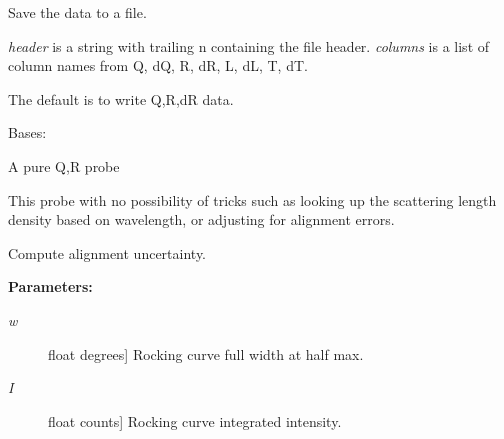 \documentclass[letterpaper,10pt,english]{sphinxmanual}
\begin{document}
\begin{fulllineitems}
\begin{fulllineitems}
\label{api/probe:refl1d.probe.ProbeSet.write_data}
Save the data to a file.

\emph{header} is a string with trailing n containing the file header.
\emph{columns} is a list of column names from Q, dQ, R, dR, L, dL, T, dT.

The default is to write Q,R,dR data.

\end{fulllineitems}


\end{fulllineitems}


\begin{fulllineitems}
\label{api/probe:refl1d.probe.QProbe}
Bases: {\hyperref[api/probe:refl1d.probe.Probe]{}}

A pure Q,R probe

This probe with no possibility of tricks such as looking up the
scattering length density based on wavelength, or adjusting for
alignment errors.

\begin{fulllineitems}
\label{api/probe:refl1d.probe.QProbe.Q}
\end{fulllineitems}


\begin{fulllineitems}
\label{api/probe:refl1d.probe.QProbe.alignment_uncertainty}
Compute alignment uncertainty.

\textbf{Parameters:}
\begin{description}
\item[{\emph{w}}] \leavevmode{[}float \textbar{} degrees{]}
Rocking curve full width at half max.

\item[{\emph{I}}] \leavevmode{[}float \textbar{} counts{]}
Rocking curve integrated intensity.


\end{description}
\end{fulllineitems}
\end{fulllineitems}
\end{document}
